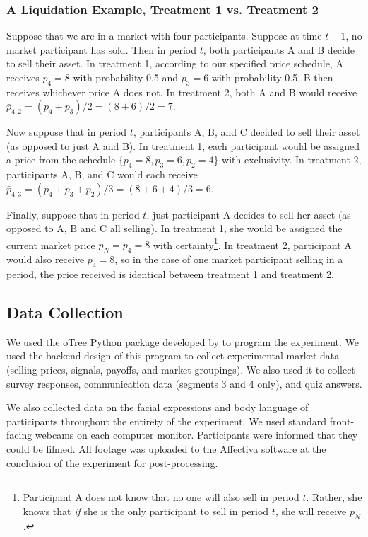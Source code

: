 \documentclass[11pt]{article}
\begin{document}
\begin{table}[H]
  \centering
  \caption{Pre-randomized experimental parameters by segment}
  \label{tab:randomized_params}
  
\end{table}

\subsubsection{A Liquidation Example, Treatment 1 vs. Treatment 2}
Suppose that we are in a market with four participants. Suppose at time $t-1$, no market participant has sold. Then in period $t$, both participants A and B decide to sell their asset. In treatment 1, according to our specified price schedule, A receives $p_4 = 8$ with probability 0.5 and $p_3 = 6$ with probability 0.5. B then receives whichever price A does not. In treatment 2, both A and B would receive $\bar{p}_{4,2} = (p_4+p_3)/2 = (8+6)/2 = 7$.

Now suppose that in period $t$, participants A, B, and C decided to sell their asset (as opposed to just A and B). In treatment 1, each participant would be assigned a price from the schedule $\{p_4=8,p_3=6,p_2=4\}$ with exclusivity. In treatment 2, participants A, B, and C would each receive $\bar{p}_{4,3} = (p_4+p_3+p_2)/3 = (8+6+4)/3 = 6$.

Finally, suppose that in period $t$, just participant A decides to sell her asset (as opposed to A, B and C all selling). In treatment 1, she would be assigned the current market price $p_N = p_4 = 8$ with certainty\footnote{Participant A does not know that no one will also sell in period $t$. Rather, she knows that \textit{if} she is the only participant to sell in period $t$, she will receive $p_N$.}. In treatment 2, participant A would also receive $p_4 = 8$, so in the case of one market participant selling in a period, the price received is identical between treatment 1 and treatment 2. 

\subsection{Data Collection}
We used the oTree  Python package developed by \cite{otree} to program the experiment. We used the backend design of this program to collect experimental market data (selling prices, signals, payoffs, and market groupings). We also used it to collect survey responses, communication data (segments 3 and 4 only), and quiz answers. 

We also collected data on the facial expressions and body language of participants throughout the entirety of the experiment. We used standard front-facing webcams on each computer monitor. Participants were informed that they could be filmed. All footage was uploaded to the Affectiva software at the conclusion of the experiment for post-processing.

\newpage




\end{document}
